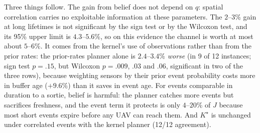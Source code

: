 \documentclass[journal,outdir=./]{IEEEtran}
\newcommand{\Emax}{E_{\max}}
\begin{document}
\begin{table}[t]\centering
\footnotesize\setlength{\tabcolsep}{3pt}
\caption{Kernel belief versus event-blind planner, paired over 12 instances of one cell, paper, $M=100$, $\Emax=1.5$~MJ, $K=4$, per-leg SA. $\Delta$catch is the relative change in the fraction of event episodes (overlapping firings merged) that are caught. Last column: two-sided sign test, ties dropped. For the three $67.5$-min rows the Wilcoxon signed-rank test gives $p=.06$, $.23$ and $.13$, and the paired-bootstrap 95\% intervals of $\Delta J$ are $[-4.4,+0.1]$, $[-4.3,+0.7]$ and $[-5.6,+0.2]\%$.}
\label{tab:info}
\end{table}

Three things follow. The gain from belief does not depend on $q$: spatial correlation carries no exploitable information at these parameters. The $2$--$3\%$ gain at long lifetimes is not significant by the sign test or by the Wilcoxon test, and its 95\% upper limit is $4.3$--$5.6\%$, so on this evidence the channel is worth at most about $5$--$6\%$. It comes from the kernel's use of observations rather than from the prior rates: the prior-rates planner alone is $2.4$--$3.4\%$ \emph{worse} (in 9 of 12 instances; sign test $p=.15$, but Wilcoxon $p=.009$, $.03$ and $.06$, significant in two of the three rows), because weighting sensors by their prior event probability costs more in buffer age ($+9.6\%$) than it saves in event age. For events comparable in duration to a sortie, belief is harmful: the planner catches more events but sacrifices freshness, and the event term it protects is only $4$--$20\%$ of $J$ because most short events expire before any UAV can reach them. And $K^{\star}$ is unchanged under correlated events with the kernel planner (12/12 agreement).
\end{document}
